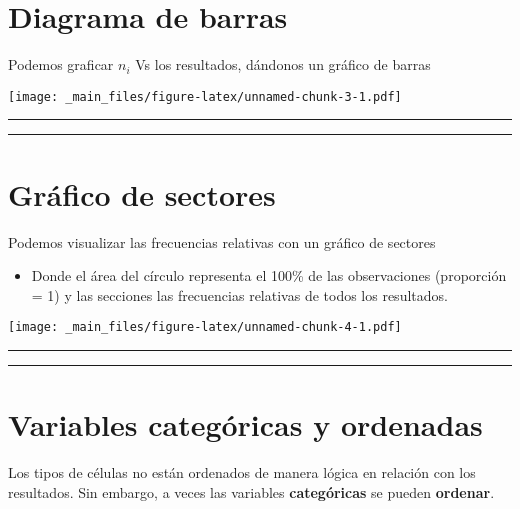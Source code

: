 \documentclass[
]{book}
\providecommand{\tightlist}{%
  \setlength{\itemsep}{0pt}\setlength{\parskip}{0pt}}
\begin{document}
\hypertarget{diagrama-de-barras}{%
\section{Diagrama de barras}\label{diagrama-de-barras}}

Podemos graficar \(n_i\) Vs los resultados, dándonos un gráfico de barras

\texttt{[image: \_main\_files/figure-latex/unnamed-chunk-3-1.pdf]}

\begin{center}\rule{0.5\linewidth}{0.5pt}\end{center}

\begin{center}\rule{0.5\linewidth}{0.5pt}\end{center}

\hypertarget{gruxe1fico-de-sectores}{%
\section{Gráfico de sectores}\label{gruxe1fico-de-sectores}}

Podemos visualizar las frecuencias relativas con un gráfico de sectores

\begin{itemize}
\tightlist
\item
  Donde el área del círculo representa el 100\% de las observaciones (proporción = 1) y las secciones las frecuencias relativas de todos los resultados.
\end{itemize}

\texttt{[image: \_main\_files/figure-latex/unnamed-chunk-4-1.pdf]}

\begin{center}\rule{0.5\linewidth}{0.5pt}\end{center}

\begin{center}\rule{0.5\linewidth}{0.5pt}\end{center}

\hypertarget{variables-categuxf3ricas-y-ordenadas}{%
\section{Variables categóricas y ordenadas}\label{variables-categuxf3ricas-y-ordenadas}}

Los tipos de células no están ordenados de manera lógica en relación con los resultados. Sin embargo, a veces las variables \textbf{categóricas} se pueden \textbf{ordenar}.
\end{document}
